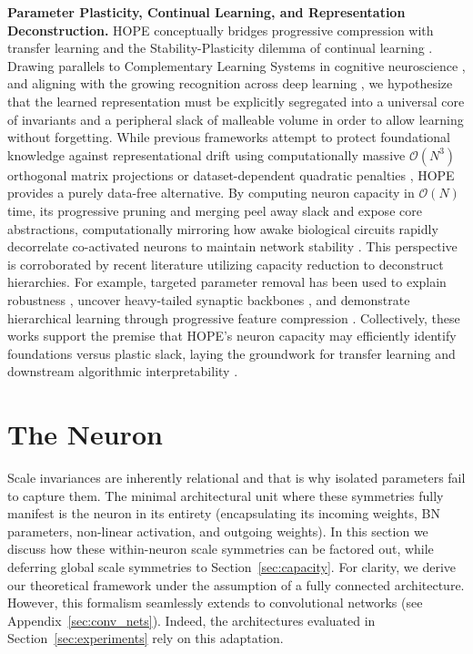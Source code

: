 \documentclass[11pt, a4paper, copyright, gdm]{google}
\newcommand{\calO}{\mathcal{O}}
\theoremstyle{definition}
\begin{document}
\noindent \textbf{Parameter Plasticity, Continual Learning, and Representation Deconstruction.}
HOPE conceptually bridges progressive compression with transfer learning \cite{yosinski2014how, hu2022lora, houlsby2019parameter} and the Stability-Plasticity dilemma of continual learning \cite{grossberg1987competitive, kirkpatrick2017overcoming, zenke2017continual}. Drawing parallels to Complementary Learning Systems in cognitive neuroscience \cite{mcclelland1995why, kumaran2016what}, and aligning with the growing recognition across deep learning \cite{kong2026reasoning}, we hypothesize that the learned representation must be explicitly segregated into a universal core of invariants and a peripheral slack of malleable volume in order to allow learning without forgetting. While previous frameworks attempt to protect foundational knowledge against representational drift using computationally massive $\calO(N^3)$ orthogonal matrix projections \cite{saha2021gradient, zeng2019continuous, yang2025loranull, huggingface2026osf} or dataset-dependent quadratic penalties \cite{kirkpatrick2017overcoming}, HOPE provides a purely data-free alternative. By computing neuron capacity in $\calO(N)$ time, its progressive pruning and merging peel away slack and expose core abstractions, computationally mirroring how awake biological circuits rapidly decorrelate co-activated neurons to maintain network stability \cite{andrei2023rapid}. This perspective is corroborated by recent literature utilizing capacity reduction to deconstruct hierarchies. For example, targeted parameter removal has been used to explain robustness \cite{he2026demystifyingpruningworksrepresentation}, uncover heavy-tailed synaptic backbones \cite{nguyen2026depth}, and demonstrate hierarchical learning through progressive feature compression \cite{wang2026understanding}. Collectively, these works support the premise that HOPE's neuron capacity may efficiently identify foundations versus plastic slack, laying the groundwork for transfer learning and downstream algorithmic interpretability \cite{bau2017network, morcos2018on, olah2020zoom, neyshabur2017exploring}.

\section{The Neuron}
\label{sec:neuron}
Scale invariances are inherently relational and that is why isolated parameters fail to capture them. The minimal architectural unit where these symmetries fully manifest is the neuron in its entirety (encapsulating its incoming weights, BN parameters, non-linear activation, and outgoing weights). In this section we discuss how these within-neuron scale symmetries can be factored out, while deferring global scale symmetries to Section~\ref{sec:capacity}. For clarity, we derive our theoretical framework under the assumption of a fully connected architecture. However, this formalism seamlessly extends to convolutional networks (see Appendix~\ref{sec:conv_nets}). Indeed, the architectures evaluated in Section~\ref{sec:experiments} rely on this adaptation.
\end{document}
